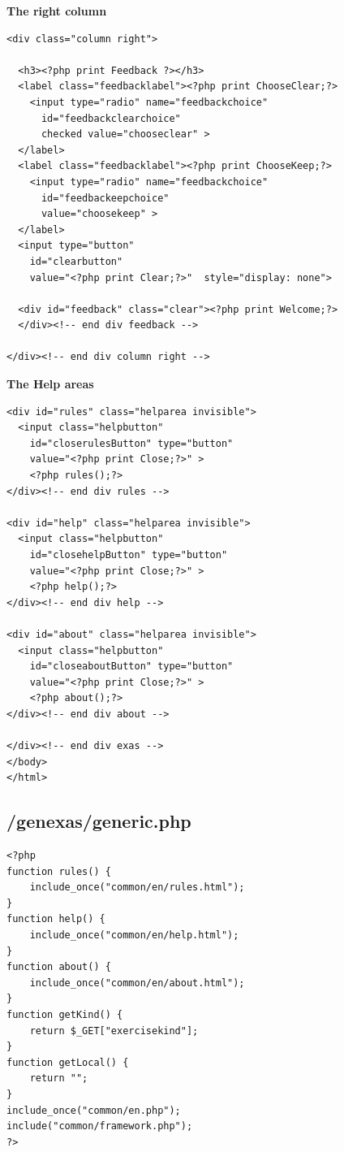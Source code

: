 \documentclass{article}
\begin{document}
\textbf{The right column}
\begin{verbatim}
<div class="column right">

  <h3><?php print Feedback ?></h3>
  <label class="feedbacklabel"><?php print ChooseClear;?>
    <input type="radio" name="feedbackchoice" 
      id="feedbackclearchoice" 
      checked value="chooseclear" >
  </label>
  <label class="feedbacklabel"><?php print ChooseKeep;?>
    <input type="radio" name="feedbackchoice"  
      id="feedbackeepchoice" 
      value="choosekeep" >
  </label>
  <input type="button" 
    id="clearbutton" 
    value="<?php print Clear;?>"  style="display: none">
		
  <div id="feedback" class="clear"><?php print Welcome;?>
  </div><!-- end div feedback -->

</div><!-- end div column right -->
\end{verbatim}
\textbf{The Help areas}
\begin{verbatim}
<div id="rules" class="helparea invisible">
  <input class="helpbutton" 
    id="closerulesButton" type="button" 
    value="<?php print Close;?>" >
    <?php rules();?>
</div><!-- end div rules -->

<div id="help" class="helparea invisible">
  <input class="helpbutton"  
    id="closehelpButton" type="button" 
    value="<?php print Close;?>" >
    <?php help();?>
</div><!-- end div help -->

<div id="about" class="helparea invisible">
  <input class="helpbutton"  
    id="closeaboutButton" type="button" 
    value="<?php print Close;?>" >
    <?php about();?>
</div><!-- end div about -->

</div><!-- end div exas -->
</body>
</html>
\end{verbatim}
\subsection{/genexas/generic.php}\label{appendix:generic}
\begin{verbatim}
<?php
function rules() {
    include_once("common/en/rules.html");
}
function help() {
    include_once("common/en/help.html");
}
function about() {
    include_once("common/en/about.html");
}
function getKind() {
    return $_GET["exercisekind"];
}
function getLocal() {
    return "";
}
include_once("common/en.php");
include("common/framework.php");
?>
\end{verbatim}
\end{document}
